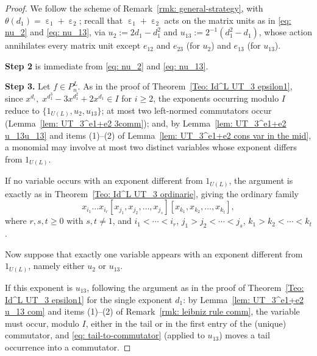 \documentclass[a4paper,reqno]{amsart}
\theoremstyle{definition}
\numberwithin{equation}{section}
\numberwithin{theorem}{section}
\DeclareMathOperator{\e}{\varepsilon}
\begin{document}
\begin{proof}
We follow the scheme of Remark~\ref{rmk: general-strategy}, with $\theta(d_1)=\e_1+\e_2$; recall that $\e_1+\e_2$ acts on the matrix units as in \eqref{eq: nu_2} and \eqref{eq: nu_13}, via $u_2:=2d_1-d_1^2$ and $u_{13}:=2^{-1}(d_1^2-d_1)$, whose action annihilates every matrix unit except $e_{12}$ and $e_{23}$ (for $u_2$) and $e_{13}$ (for $u_{13}$).

\textbf{Step 2} is immediate from \eqref{eq: nu_2} and \eqref{eq: nu_13}.
     
\textbf{Step 3.} Let  $f\in P_n^L.$ As in the proof of Theorem~\ref{Teo: Id^L UT_3 epsilon1}, since $x^{d_i}, \; x^{d_1^3}-3x^{d_1^2}+2x^{d_1}\in I$ for $i\geq2$, the exponents occurring modulo $I$ reduce to $\{1_{U(L)}, u_{2}, u_{13}\}$; at most two left-normed commutators occur (Lemma~\ref{lem: UT_3^e1+e2 3comm}); and, by Lemma~\ref{lem: UT_3^e1+e2 u_13u_13} and items (1)--(2) of Lemma~\ref{lem: UT_3^e1+e2 cons var in the mid}, a monomial may involve at most two distinct variables whose exponent differs from $1_{U(L)}$.

If no variable occurs with an exponent different from $1_{U(L)}$, the argument is exactly as in Theorem~\ref{Teo: Id^L UT_3 ordinarie}, giving the ordinary family
\begin{equation*}
    x_{i_{1}}\dots x_{i_{r}}[x_{j_1},x_{j_2},\dots,x_{j_s}][x_{k_1},x_{k_2},\dots,x_{k_t}],
\end{equation*}
where $ r, s, t\geq 0$ with $s,t\neq 1$, and $i_1< \cdots < i_r$, $j_1>j_2<  \cdots < j_s$,  $k_1>k_2<  \cdots < k_t$.

Now suppose that exactly one variable appears with an exponent different from $1_{U(L)}$, namely either $u_{2}$ or $u_{13}$.

If this exponent is $u_{13}$, following the argument as in the proof of Theorem~\ref{Teo: Id^L UT_3 epsilon1} for the single exponent $d_1$: by Lemma~\ref{lem:  UT_3^e1+e2 u_13 com} and items (1)--(2) of Remark~\ref{rmk: leibniz rule comm}, the variable must occur, modulo $I$, either in the tail or in the first entry of the (unique) commutator, and \eqref{eq: tail-to-commutator} (applied to $u_{13}$) moves a tail occurrence into a commutator.


\end{proof}
\end{document}
